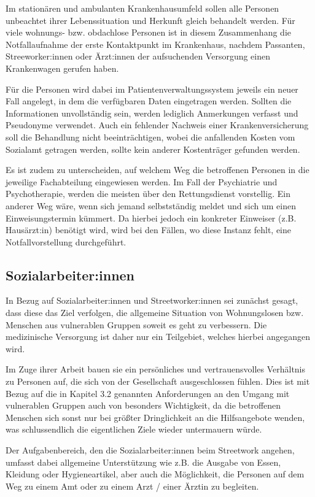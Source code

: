 Im stationären und ambulanten Krankenhausumfeld sollen alle Personen unbeachtet ihrer Lebenssituation und Herkunft gleich behandelt werden. Für viele wohnungs- bzw. obdachlose Personen ist in diesem Zusammenhang die Notfallaufnahme der erste Kontaktpunkt im Krankenhaus, nachdem Passanten, Streeworker:innen oder Ärzt:innen der aufsuchenden Versorgung einen Krankenwagen gerufen haben.

Für die Personen wird dabei im Patientenverwaltungssystem jeweils ein neuer Fall angelegt, in dem die verfügbaren Daten eingetragen werden. Sollten die Informationen unvollständig sein, werden lediglich Anmerkungen verfasst und Pseudonyme verwendet. Auch ein fehlender Nachweis einer Krankenversicherung soll die Behandlung nicht beeinträchtigen, wobei die anfallenden Kosten vom Sozialamt getragen werden, sollte kein anderer Kostenträger gefunden werden.

Es ist zudem zu unterscheiden, auf welchem Weg die betroffenen Personen in die jeweilige Fachabteilung eingewiesen werden. Im Fall der Psychiatrie und Psychotherapie, werden die meisten über den Rettungsdienst vorstellig. Ein anderer Weg wäre, wenn sich jemand selbstständig meldet und sich um einen Einweisungstermin kümmert. Da hierbei jedoch ein konkreter Einweiser (z.B. Hausärzt:in) benötigt wird, wird bei den Fällen, wo diese Instanz fehlt, eine Notfallvorstellung durchgeführt.

\subsection{Sozialarbeiter:innen}

In Bezug auf Sozialarbeiter:innen und Streetworker:innen sei zunächst gesagt, dass diese das Ziel verfolgen, die allgemeine Situation von Wohnungslosen bzw. Menschen aus vulnerablen Gruppen soweit es geht zu verbessern. Die medizinische Versorgung ist daher nur ein Teilgebiet, welches hierbei angegangen wird.

Im Zuge ihrer Arbeit bauen sie ein persönliches und vertrauensvolles Verhältnis zu Personen auf, die sich von der Gesellschaft ausgeschlossen fühlen. Dies ist mit Bezug auf die in Kapitel 3.2 genannten Anforderungen an den Umgang mit vulnerablen Gruppen auch von besonders Wichtigkeit, da die betroffenen Menschen sich sonst nur bei größter Dringlichkeit an die Hilfsangebote wenden, was schlussendlich die eigentlichen Ziele wieder untermauern würde.

Der Aufgabenbereich, den die Sozialarbeiter:innen beim Streetwork angehen, umfasst dabei allgemeine Unterstützung wie z.B. die Ausgabe von Essen, Kleidung oder Hygieneartikel, aber auch die Möglichkeit, die Personen auf dem Weg zu einem Amt oder zu einem Arzt / einer Ärztin zu begleiten.

